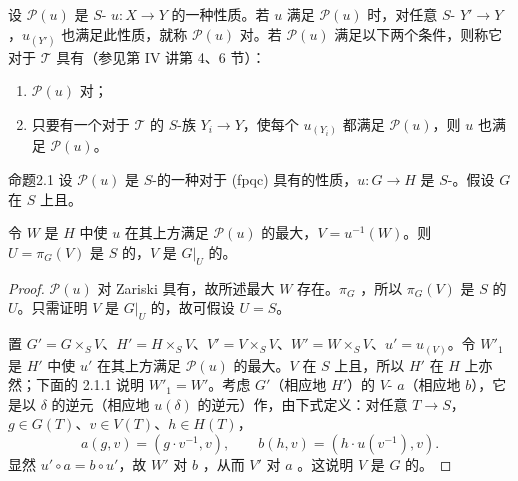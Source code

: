 设 $\mathscr P(u)$ 是 $S$- $u:X\to Y$ 的一种性质。若 $u$ 满足 $\mathscr P(u)$ 时，对任意 $S$- $Y'\to Y$，$u_{(Y')}$ 也满足此性质，就称 $\mathscr P(u)$ 对。若 $\mathscr P(u)$ 满足以下两个条件，则称它对于 $\mathcal T$ 具有（参见第 IV 讲第 4、6 节）：
\begin{enumerate}
\item[a)] $\mathscr P(u)$ 对；
\item[b)] 只要有一个对于 $\mathcal T$ 的 $S$-族 $Y_i\to Y$，使每个 $u_{(Y_i)}$ 都满足 $\mathscr P(u)$，则 $u$ 也满足 $\mathscr P(u)$。
\end{enumerate}
\begin{SGAresult}{命题}{2.1}
设 $\mathscr P(u)$ 是 $S$-的一种对于 (fpqc) 具有的性质，$u:G\to H$ 是 $S$-。假设 $G$ 在 $S$ 上且。

令 $W$ 是 $H$ 中使 $u$ 在其上方满足 $\mathscr P(u)$ 的最大，$V=u^{-1}(W)$。则 $U=\pi_G(V)$ 是 $S$ 的，$V$ 是 $G|_U$ 的。
\end{SGAresult}
\begin{proof}
$\mathscr P(u)$ 对 Zariski 具有，故所述最大 $W$ 存在。$\pi_G$ ，所以 $\pi_G(V)$ 是 $S$ 的 $U$。只需证明 $V$ 是 $G|_U$ 的，故可假设 $U=S$。

置 $G'=G\times_SV$、$H'=H\times_SV$、$V'=V\times_SV$、$W'=W\times_SV$、$u'=u_{(V)}$。令 $W'_1$ 是 $H'$ 中使 $u'$ 在其上方满足 $\mathscr P(u)$ 的最大。$V$ 在 $S$ 上且，所以 $H'$ 在 $H$ 上亦然；下面的 2.1.1 说明 $W'_1=W'$。考虑 $G'$（相应地 $H'$）的 $V$- $a$（相应地 $b$），它是以 $\delta$ 的逆元（相应地 $u(\delta)$ 的逆元）作，由下式定义：对任意 $T\to S$，$g\in G(T)$、$v\in V(T)$、$h\in H(T)$，
\[
a(g,v)=(g\cdot v^{-1},v),\qquad b(h,v)=(h\cdot u(v^{-1}),v).
\]
显然 $u'\circ a=b\circ u'$，故 $W'$ 对 $b$ ，从而 $V'$ 对 $a$ 。这说明 $V$ 是 $G$ 的。
\end{proof}
